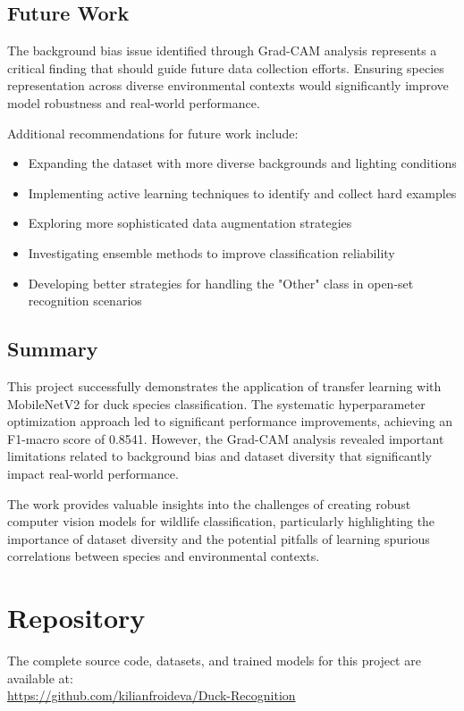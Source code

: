 \documentclass[12pt,a4paper]{article}
\begin{document}
\subsection{Future Work}

The background bias issue identified through Grad-CAM analysis represents a critical finding that should guide future data collection efforts. Ensuring species representation across diverse environmental contexts would significantly improve model robustness and real-world performance.

Additional recommendations for future work include:

\begin{itemize}
    \item Expanding the dataset with more diverse backgrounds and lighting conditions
    \item Implementing active learning techniques to identify and collect hard examples
    \item Exploring more sophisticated data augmentation strategies
    \item Investigating ensemble methods to improve classification reliability
    \item Developing better strategies for handling the "Other" class in open-set recognition scenarios
\end{itemize}

\subsection{Summary}

This project successfully demonstrates the application of transfer learning with MobileNetV2 for duck species classification. The systematic hyperparameter optimization approach led to significant performance improvements, achieving an F1-macro score of 0.8541. However, the Grad-CAM analysis revealed important limitations related to background bias and dataset diversity that significantly impact real-world performance.

The work provides valuable insights into the challenges of creating robust computer vision models for wildlife classification, particularly highlighting the importance of dataset diversity and the potential pitfalls of learning spurious correlations between species and environmental contexts.

\section{Repository}

The complete source code, datasets, and trained models for this project are available at: \\
\url{https://github.com/kilianfroideva/Duck-Recognition}
\end{document}

